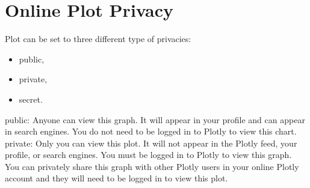 \section{Online Plot Privacy}
\begin{frame}
Plot can be set to three different type of privacies:
\begin{itemize}
\item public, 
\item private,
\item secret. 
\end{itemize}
\end{frame}
public:
 Anyone can view this graph. It will appear in your profile
 and can appear in search engines. You do not need to be
 logged in to Plotly to view this chart.
private:
 Only you can view this plot. It will not appear in the
 Plotly feed, your profile, or search engines. You must be
 logged in to Plotly to view this graph. You can privately
 share this graph with other Plotly users in your online
 Plotly account and they will need to be logged in to
 view this plot.

